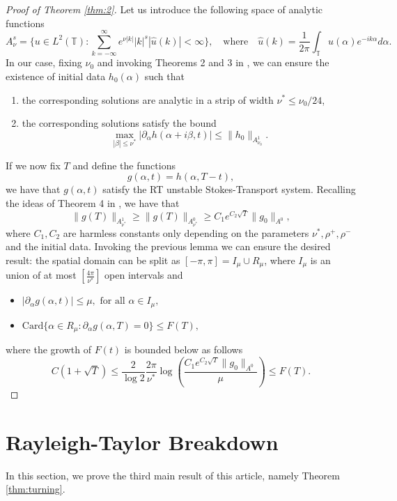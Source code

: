 \documentclass[11pt]{article}
\numberwithin{equation}{section}
\newcommand{\T}{\mathbb{T}}
\begin{document}
\begin{proof}[Proof of Theorem \ref{thm:2}]
Let us introduce the following space of analytic functions
\begin{equation}\label{wiener}
A^{s}_\nu=\{u\in L^2(\mathbb{T}): \sum_{k=-\infty}^\infty e^{\nu |k|}|k|^{s}|\hat{u}(k)|<\infty\},\quad\mbox{where}\quad \hat{u}(k)=\frac1{2\pi}\int_\T u(\alpha)e^{-ik\alpha}d\alpha.
\end{equation}
In our case, fixing $\nu_0$ and invoking Theorems 2 and 3 in \cite{GGS25_SIMA}, we can ensure the existence of initial data $h_0(\alpha)$ such that
\begin{enumerate}
\item the corresponding solutions are analytic in a strip of width $\nu^*\leq \nu_0/24$,
\item the corresponding solutions satisfy the bound
$$
\max_{|\beta|\leq \nu^*}|\partial_\alpha h(\alpha+i\beta,t)|\leq \|h_0\|_{A^1_{\nu_0}}.
$$
\end{enumerate}
If we now fix $T$ and define the functions
$$
g(\alpha,t)=h(\alpha,T-t),
$$
we have that $g(\alpha,t)$ satisfy the RT unstable Stokes-Transport system. Recalling the ideas of Theorem 4 in \cite{GGS25_SIMA}, we have that
$$
\|g(T)\|_{A^1_{\nu^*}}\geq \|g(T)\|_{A^0_{\nu^*}}\geq C_1e^{C_2 \sqrt{T}}\|g_0\|_{A^0},
$$
where $C_1, C_2$ are harmless constants only depending on the parameters $\nu^\ast, \rho^+, \rho^-$ and the initial data. Invoking the previous lemma we can ensure the desired result: the spatial domain can be split as $[-\pi, \pi]=I_\mu\cup R_\mu$, where $I_\mu$ is an union of at most $[\frac{4\pi}{\nu^*}]$ open intervals and
\begin{itemize}
\item $|\partial_\alpha g(\alpha,t)| \leq \mu, \text{ for all }\alpha\in I_\mu,$
\item $\text{Card}\{\alpha \in R_\mu : \partial_\alpha g(\alpha,T)=0\}\leq
F(T),$
\end{itemize}
where the growth of $F(t)$ is bounded below as follows
$$
C(1+\sqrt{T})\leq \frac{2}{\log 2}\frac{2\pi}{\nu^*}\log\left(\frac{C_1e^{C_2 \sqrt{T}}\|g_0\|_{A^0}}{\mu}\right)\leq F(T).
$$
\end{proof}


\section{Rayleigh-Taylor Breakdown}\label{sec:RTbreakdown}

In this section, we prove the third main result of this article, namely Theorem \ref{thm:turning}.
\end{document}
